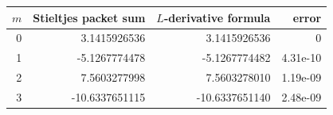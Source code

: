 \begin{tabular}{rrrr}
\toprule
$m$ & Stieltjes packet sum & $L$-derivative formula & error\\
\midrule
0 & 3.1415926536 & 3.1415926536 & 0\\
1 & -5.1267774478 & -5.1267774482 & 4.31e-10\\
2 & 7.5603277998 & 7.5603278010 & 1.19e-09\\
3 & -10.6337651115 & -10.6337651140 & 2.48e-09\\
\bottomrule
\end{tabular}